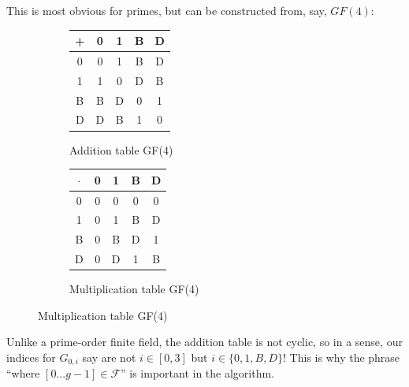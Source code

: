 \documentclass[11pt, oneside]{article} 	%
\begin{document}
This is most obvious for primes, but can be constructed from, say, $GF(4):$

\begin{figure}[!htb]
\centering
\begin{subfigure}{.3\textwidth}
 \centering
 \begin{tabular}{c | c c c c}
  + & 0 & 1 & B & D \\
\hline
  0 & 0 & 1 & B & D \\
  1 & 1 & 0 & D & B \\
  B & B & D & 0 & 1 \\
  D & D & B & 1 & 0 \\
  \end{tabular}
 \caption{Addition table GF(4)}
\label{fig:gf3-add}
\end{subfigure}
\begin{subfigure}{.3\textwidth}
 \centering
\begin{tabular}{c | c c c c}
  $\cdot$ & 0 & 1 & B & D \\
\hline
  0 & 0 & 0 & 0 & 0 \\
  1 & 0 & 1 & B & D \\
  B & 0 & B & D & 1 \\
  D & 0 & D & 1 & B \\
\end{tabular}
 \caption{Multiplication table GF(4)}
\label{fig:gf3-mult}
\end{subfigure}
\end{figure}

Unlike a prime-order finite field, the addition table is not cyclic, so in a sense, our indices for $G_{0,i}$ say are not $i \in [0, 3]$ but $i \in \{0,1,B,D\}$! This is why the phrase ``where $[0...g-1] \in \mathcal{F}$'' is important in the algorithm.
\end{document}
